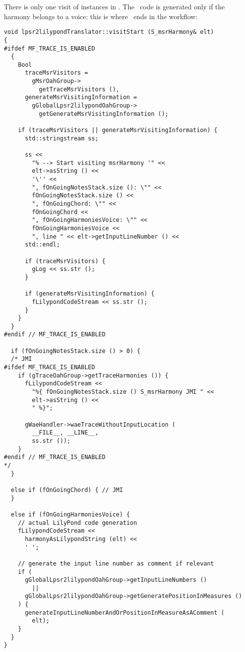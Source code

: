 There is only one visit of  instances in . The \lily\ code is generated only if the harmony belongs to a voice: this is where \denorm\ ends in the workflow:%
\begin{lstlisting}[language=CPlusPlus]
void lpsr2lilypondTranslator::visitStart (S_msrHarmony& elt)
{
#ifdef MF_TRACE_IS_ENABLED
  {
    Bool
      traceMsrVisitors =
        gMsrOahGroup->
          getTraceMsrVisitors (),
      generateMsrVisitingInformation =
        gGlobalLpsr2lilypondOahGroup->
          getGenerateMsrVisitingInformation ();

    if (traceMsrVisitors || generateMsrVisitingInformation) {
      std::stringstream ss;

      ss <<
        "% --> Start visiting msrHarmony '" <<
        elt->asString () <<
        '\'' <<
        ", fOnGoingNotesStack.size (): \"" <<
        fOnGoingNotesStack.size () <<
        ", fOnGoingChord: \"" <<
        fOnGoingChord <<
        ", fOnGoingHarmoniesVoice: \"" <<
        fOnGoingHarmoniesVoice <<
        ", line " << elt->getInputLineNumber () <<
      std::endl;

      if (traceMsrVisitors) {
        gLog << ss.str ();
      }

      if (generateMsrVisitingInformation) {
        fLilypondCodeStream << ss.str ();
      }
    }
  }
#endif // MF_TRACE_IS_ENABLED

  if (fOnGoingNotesStack.size () > 0) {
  /* JMI
#ifdef MF_TRACE_IS_ENABLED
    if (gTraceOahGroup->getTraceHarmonies ()) {
      fLilypondCodeStream <<
        "%{ fOnGoingNotesStack.size () S_msrHarmony JMI " <<
        elt->asString () <<
        " %}";

      gWaeHandler->waeTraceWithoutInputLocation (
        __FILE__, __LINE__,
        ss.str ());
    }
#endif // MF_TRACE_IS_ENABLED
*/
  }

  else if (fOnGoingChord) { // JMI
  }

  else if (fOnGoingHarmoniesVoice) {
    // actual LilyPond code generation
    fLilypondCodeStream <<
      harmonyAsLilypondString (elt) <<
      ' ';

    // generate the input line number as comment if relevant
    if (
      gGlobalLpsr2lilypondOahGroup->getInputLineNumbers ()
        ||
      gGlobalLpsr2lilypondOahGroup->getGeneratePositionInMeasures ()
    ) {
      generateInputLineNumberAndOrPositionInMeasureAsAComment (
        elt);
    }
  }
}
\end{lstlisting}

